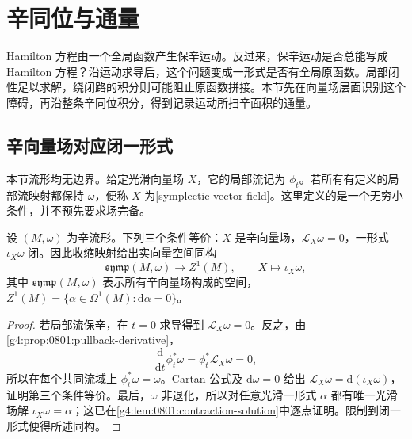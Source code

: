 
% 
% 

\section{辛同位与通量}
\label{g4:sec:0903}

Hamilton 方程由一个全局函数产生保辛运动。反过来，保辛运动是否总能写成 Hamilton 方程？沿运动求导后，这个问题变成一形式是否有全局原函数。局部闭性足以求解，绕闭路的积分则可能阻止原函数拼接。本节先在向量场层面识别这个障碍，再沿整条辛同位积分，得到记录运动所扫辛面积的通量。

\subsection{辛向量场对应闭一形式}
\label{g4:subsec:0903:01}

本节流形均无边界。给定光滑向量场 \(X\)，它的局部流记为 \(\phi_t\)。若所有有定义的局部流映射都保持 \(\omega\)，便称 \(X\) 为[symplectic vector field]。这里定义的是一个无穷小条件，并不预先要求场完备。

\begin{proposition}\label{g4:prop:0903:symplectic-closed}
	设 \((M,\omega)\) 为辛流形。下列三个条件等价：\(X\) 是辛向量场，\(\mathcal L_X\omega=0\)，一形式 \(\iota_X\omega\) 闭。因此收缩映射给出实向量空间同构
	\[
		\mathfrak{symp}(M,\omega)
		\longrightarrow Z^1(M),\qquad X\longmapsto\iota_X\omega,
	\]
	其中 \(\mathfrak{symp}(M,\omega)\) 表示所有辛向量场构成的空间，\(Z^1(M)=\{\alpha\in\Omega^1(M):\mathrm{d}\alpha=0\}\)。
\end{proposition}
\begin{proof}
	若局部流保辛，在 \(t=0\) 求导得到 \(\mathcal L_X\omega=0\)。反之，由\cref{g4:prop:0801:pullback-derivative}，
	\[
		\frac{\mathrm{d}}{\mathrm{d}t}\phi_t^*\omega
		=\phi_t^*\mathcal L_X\omega=0,
	\]
	所以在每个共同流域上 \(\phi_t^*\omega=\omega\)。Cartan 公式及 \(\mathrm{d}\omega=0\) 给出 \(\mathcal L_X\omega=\mathrm{d}(\iota_X\omega)\)，证明第三个条件等价。最后，\(\omega\) 非退化，所以对任意光滑一形式 \(\alpha\) 都有唯一光滑场解 \(\iota_X\omega=\alpha\)；这已在\cref{g4:lem:0801:contraction-solution}中逐点证明。限制到闭一形式便得所述同构。
\end{proof}

